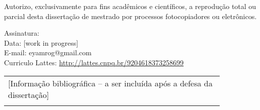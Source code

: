 \begin{titlepage}
    Autorizo, exclusivamente para fins acadêmicos e científicos, a reprodução total ou parcial desta dissertação de mestrado por processos fotocopiadores ou eletrônicos.
    
    \vspace{2cm}
    Assinatura: \makebox[0.75\textwidth]{\hrulefill}\\
    Data: [work in progress]\\
    E-mail: eyamrog@gmail.com\\
    Curriculo Lattes: \href{http://lattes.cnpq.br/9204618373258699}{http://lattes.cnpq.br/9204618373258699}\\
    \vfill
    \begin{center}
        \begin{tabular}{|p{0.85\linewidth}|}
            \hline
            [Informação bibliográfica -- a ser incluída após a defesa da dissertação]\\
            \\ \hline
        \end{tabular}

\end{center}
\end{titlepage}
